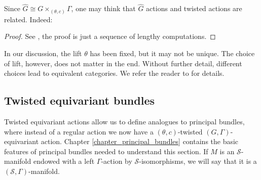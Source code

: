 Since \(\hat{G}\cong G\times_{(\theta, c)}\Gamma\), one may think that \(\hat{G}\) actions and twisted actions are related. Indeed:

\begin{proof}
    See \parencite[Prop. 2.7 and Prop. 2.12]{barajas2023non}, the proof is just a sequence of lengthy computations. 
\end{proof}

\begin{obs}  
    In our discussion, the lift \(\theta\) has been fixed, but it may not be unique. The choice of lift, however, does not matter in the end. Without further detail, different choices lead to equivalent categories. We refer the reader to \parencite[Sec. 4]{barajas2023non} for details.
\end{obs}

\subsection{Twisted equivariant bundles}
Twisted equivariant actions allow us to define analogues to principal bundles, where instead of a regular action we now have a \((\theta,c)\)-twisted \((G, \Gamma)\)-equivariant action. Chapter \ref{chapter_principal_bundles} contains the basic features of principal bundles needed to understand this section. If \(M\) is an \(\mathcal{S}\)-manifold endowed with a left \(\Gamma\)-action by \(\mathcal{S}\)-isomorphisms, we will say that it is a \((\mathcal{S},\Gamma)\)-manifold.

